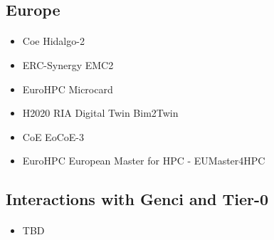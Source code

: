 \subsection{Europe}
\begin{frame}{\insertsectionhead}
  \framesubtitle{\insertsubsectionhead}
\begin{itemize}
    \item Coe Hidalgo-2 
    \item ERC-Synergy	EMC2
    \item EuroHPC	Microcard
    \item H2020 RIA Digital Twin	Bim2Twin
    \item CoE	EoCoE-3	
    \item EuroHPC	European Master for HPC - EUMaster4HPC	
\end{itemize}
\end{frame}

\subsection{Interactions with Genci and Tier-0}
\begin{frame}{\insertsectionhead}
  \framesubtitle{\insertsubsectionhead}

\begin{itemize}
    \item TBD
\end{itemize}

\end{frame}

